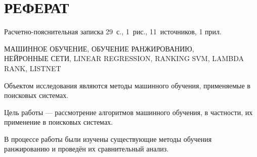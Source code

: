 \chapter*{РЕФЕРАТ}

Расчетно-пояснительная записка 29~с., 1~рис., 11~источников, 1 прил.

\noindent\MakeUppercase{машинное обучение, обучение ранжированию,\\нейронные сети, linear regression, ranking svm, lambda rank, listnet}

Объектом исследования являются методы машинного обучения, применяемые в поисковых системах.

Цель работы --- рассмотрение алгоритмов машинного обучения, в частности, их применение в поисковых системах.

В процессе работы были изучены существующие методы обучения ранжированию и проведён их сравнительный анализ.

\setcounter{page}{3}